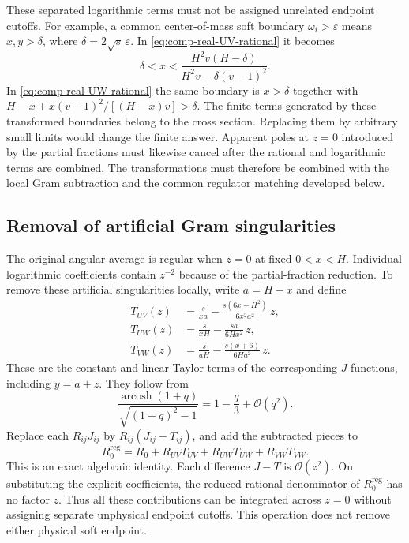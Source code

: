 These separated logarithmic terms must not be assigned unrelated
endpoint cutoffs. For example, a common center-of-mass soft boundary
$\omega_i>\varepsilon$ means $x,y>\delta$, where
$\delta=2\sqrt{s}\,\varepsilon$. In
\eqref{eq:comp-real-UV-rational} it becomes
\begin{equation}
 \delta<x<\frac{H^2v(H-\delta)}{H^2v-\delta(v-1)^2}.
\end{equation}
In \eqref{eq:comp-real-UW-rational} the same boundary is
$x>\delta$ together with
$H-x+x(v-1)^2/[(H-x)v]>\delta$.
The finite terms generated by these transformed boundaries belong
to the cross section. Replacing them by arbitrary small limits
would change the finite answer. Apparent poles at $z=0$ introduced
by the partial fractions must likewise cancel after the rational
and logarithmic terms are combined. The transformations must therefore be combined with the local
Gram subtraction and the common regulator matching developed below.

\subsection{Removal of artificial Gram singularities}
The original angular average is regular when $z=0$ at fixed
$0<x<H$. Individual logarithmic coefficients contain $z^{-2}$
because of the partial-fraction reduction. To remove these
artificial singularities locally, write $a=H-x$ and define
\begin{align}
 T_{UV}(z)&=\frac{s}{xa}-\frac{s(6x+H^2)}{6x^2a^2}\,z,\\
 T_{UW}(z)&=\frac{s}{xH}-\frac{sa}{6Hx^2}\,z,\\
 T_{VW}(z)&=\frac{s}{aH}-\frac{s(x+6)}{6Ha^2}\,z.
\end{align}
These are the constant and linear Taylor terms of the corresponding
$J$ functions, including $y=a+z$. They follow from
\begin{equation}
 \frac{\operatorname{arcosh}(1+q)}{\sqrt{(1+q)^2-1}}
       =1-\frac q3+\mathcal O(q^2).
\end{equation}
Replace each $R_{ij}J_{ij}$ by
$R_{ij}(J_{ij}-T_{ij})$, and add the subtracted pieces to
\begin{equation}
 R_0^{\mathrm{reg}}=R_0+
             R_{UV}T_{UV}+R_{UW}T_{UW}+R_{VW}T_{VW}.
\end{equation}
This is an exact algebraic identity. Each difference $J-T$ is
$\mathcal O(z^2)$. On substituting the explicit coefficients,
the reduced rational denominator of $R_0^{\mathrm{reg}}$ has no
factor $z$. Thus all these contributions can be integrated across
$z=0$ without assigning separate unphysical endpoint cutoffs.
This operation does not remove either physical soft endpoint.

